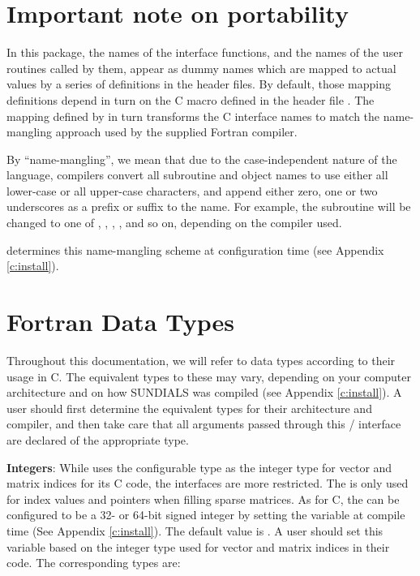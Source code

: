 
\section{Important note on portability}
In this package, the names of the interface functions, and the names
of the {\F} user routines called by them, appear as dummy names
which are mapped to actual values by a series of definitions in the
header files.  By default, those mapping definitions depend in turn
on the C macro  defined in the header file
.  
The mapping defined by  in turn
transforms the C interface names to match the name-mangling approach
used by the supplied Fortran compiler.

By ``name-mangling'', we mean that due to the case-independent nature of
the {\F} language, {\F} compilers convert all subroutine and
object names to use either all lower-case or all upper-case
characters, and append either zero, one or two underscores as a prefix
or suffix to the name.  For example, the {\F} subroutine
 will be changed to one of ,
, , , and so on,
depending on the {\F} compiler used.

{\sundials} determines this name-mangling scheme at configuration time
(see Appendix \ref{c:install}).

\section{Fortran Data Types}\label{ss:fcdata}
Throughout this documentation, we will refer to data types according
to their usage in C.  The equivalent types to these may vary,
depending on your computer architecture and on how SUNDIALS was
compiled (see Appendix \ref{c:install}).  A {\F} user should first
determine the equivalent types for their architecture and compiler,
and then take care that all arguments passed through this {\F}/{\CC}
interface are declared of the appropriate type.

\textbf{Integers}: While {\sundials} uses the configurable 
 type as the
integer type for vector and matrix indices for its C code,
the {\F} interfaces are more restricted.  The  
is only used for index values and pointers when filling sparse matrices.
As for C, the  can
be configured to be a 32- or 64-bit signed integer by setting the variable
 at compile time (See Appendix \ref{c:install}).
The default value is .
A {\F} user should set this variable based on the integer type used for
vector and matrix indices in their {\F} code. The corresponding {\F}
types are:

